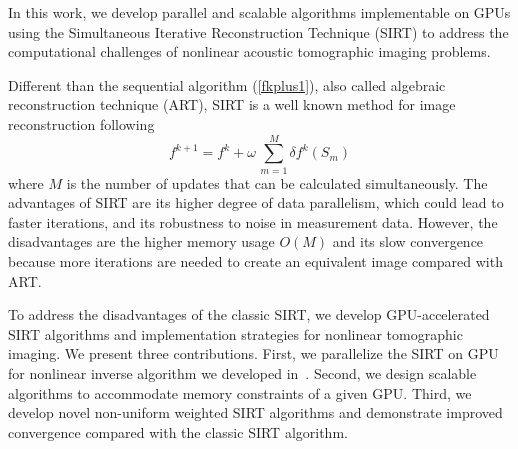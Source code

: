 \documentclass{sig-alternate}
\begin{document}

In this work, we develop parallel and scalable algorithms implementable on GPUs using the Simultaneous Iterative Reconstruction Technique (SIRT) to address the computational challenges of nonlinear acoustic tomographic imaging problems.



Different than the sequential algorithm (\ref{fkplus1}), also called algebraic reconstruction technique (ART), SIRT is a well known method for image reconstruction following~\cite{AndersenKak,BenjaminKecketal}
\begin{equation}
f^{k+1} = f^k + \omega \, \sum_{m=1}^M \delta f^k(S_m) \label{fkplus12}
\end{equation}
where $M$ is the number of updates that can be calculated simultaneously. The advantages of SIRT are its higher degree of data parallelism, which could lead to faster iterations, and its robustness to noise in measurement data. However, the disadvantages are the higher memory usage $O(M)$ and its slow convergence because more iterations are needed to create an equivalent image compared with ART.


To address the disadvantages of the classic SIRT, we develop GPU-accelerated SIRT algorithms and implementation strategies for nonlinear tomographic imaging. We present three contributions. First, we parallelize the SIRT on GPU for nonlinear inverse algorithm we developed in~\cite{Dong13}. Second, we  design scalable algorithms to accommodate memory constraints of a given GPU. Third, we develop novel non-uniform weighted SIRT algorithms and demonstrate improved convergence compared with the classic SIRT algorithm.
\end{document}
